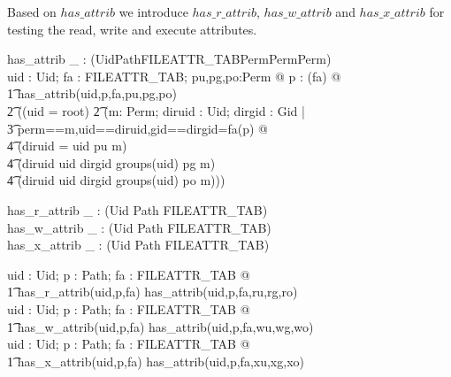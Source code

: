 Based on $has\_attrib$ we introduce $has\_r\_attrib$, $has\_w\_attrib$ and
$has\_x\_attrib$ for testing the read, write and execute attributes.
\begin{doc}{3}
\begin{axdef}
  has\_attrib \_ : \power(Uid\cross Path\cross FILEATTR\_TAB\cross Perm\cross Perm\cross Perm)\\ 
  \where
  \forall uid : Uid; fa : FILEATTR\_TAB; pu,pg,po:Perm @ \forall p : \dom(fa) @\\
  \t1 has\_attrib(uid,p,fa,pu,pg,po) \iff \\
  \t2 ((uid = root) \lor
  \t2  (\forall m: \power Perm; diruid : Uid; dirgid : Gid |\\
  \t3 \lblot perm==m,uid==diruid,gid==dirgid\rblot =fa(p) @\\
  \t4 (diruid = uid \land pu \in m)  \lor                       \\
  \t4 (diruid \neq uid \land dirgid \in groups(uid) \land pg \in m) \lor \\
  \t4 (diruid \neq uid \land dirgid \notin groups(uid) \land po \in m))) \\
\end{axdef}
\begin{axdef}
  has\_r\_attrib \_ : \power (Uid \cross Path \cross FILEATTR\_TAB) \\
  has\_w\_attrib \_ : \power (Uid \cross Path \cross FILEATTR\_TAB) \\
  has\_x\_attrib \_ : \power (Uid \cross Path \cross FILEATTR\_TAB) \\
  \where

  \forall uid : Uid; p : Path; fa : FILEATTR\_TAB @ \\
  \t1 has\_r\_attrib(uid,p,fa) \iff has\_attrib(uid,p,fa,ru,rg,ro) \\
  
  \forall uid : Uid; p : Path; fa : FILEATTR\_TAB @ \\
  \t1 has\_w\_attrib(uid,p,fa) \iff has\_attrib(uid,p,fa,wu,wg,wo) \\
  
  \forall uid : Uid; p : Path; fa : FILEATTR\_TAB @ \\
  \t1 has\_x\_attrib(uid,p,fa) \iff has\_attrib(uid,p,fa,xu,xg,xo) \\
\end{axdef}
\end{doc}

